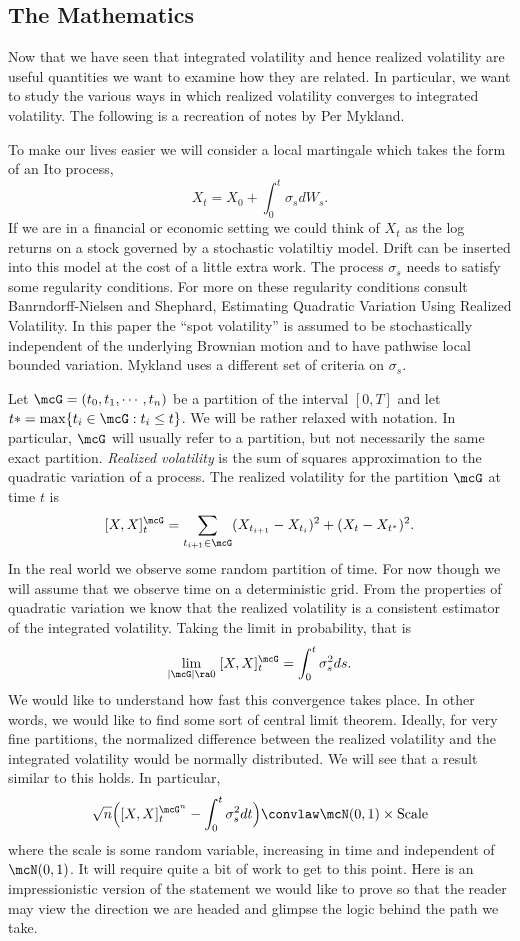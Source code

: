 \documentclass{report}
\begin{document}
\subsection{The Mathematics}

Now that we have seen that integrated volatility and hence realized
volatility are useful quantities we want to examine how they are
related.  In particular, we want to study the various ways in which
realized volatility converges to integrated volatility.  The following
is a recreation of notes by Per Mykland.

To make our lives easier we will consider a local martingale which
takes the form of an Ito process,
\[
X_t = X_0 + \int_0^t \sigma_s dW_s.
\]
If we are in a financial or economic setting we could think of $X_t$
as the log returns on a stock governed by a stochastic volatiltiy
model.  Drift can be inserted into this model at the cost of a little
extra work.  The process $\sigma_s$ needs to satisfy some regularity
conditions.  For more on these regularity conditions consult
Banrndorff-Nielsen and Shephard, Estimating Quadratic Variation Using
Realized Volatility.  In this paper the ``spot volatility'' is assumed
to be stochastically independent of the underlying Brownian motion and
to have pathwise local bounded variation.  Mykland uses a different
set of criteria on $\sigma_s$.

Let $\mcG = (t_0, t_1, \cdots, t_n)$ be a partition of the interval
$[0,T]$ and let $t* = \max \{ t_i \in \mcG : t_i \leq t \}$.  We will
be rather relaxed with notation.  In particular, $\mcG$ will usually
refer to a partition, but not necessarily the same exact partition.  
\emph{Realized volatility} is the sum of squares approximation to the
quadratic variation of a process.  The realized volatility for the
partition $\mcG$ at time $t$ is
\[
[X,X]^{\mcG}_t = \sum_{t_{i+1} \in \mcG} (X_{t_{i+1}} - X_{t_i})^2 +
(X_{t} - X_{t^*})^2.
\]
In the real world we observe some random partition of time.  For now
though we will assume that we observe time on a deterministic grid. 
From the properties of quadratic variation we know that the realized
volatility is a consistent estimator of the integrated volatility. 
Taking the limit in probability, that is
\[
\lim_{|\mcG| \ra 0} \; [X,X]^{\mcG}_t = \int_0^t \sigma_s^2 ds.
\]
We would like to understand how fast this convergence takes place.  In
other words, we would like to find some sort of central limit theorem. 
Ideally, for very fine partitions, the normalized difference between
the realized volatility and the integrated volatility would be
normally distributed.  We will see that a result similar to this
holds.  In particular,
\[
\sqrt{n} \Big([X,X]^{\mcG^n}_t - \int_0^t \sigma_s^2 dt \Big) \convlaw
\mcN(0,1) \times \textmd{Scale}
\]
where the scale is some random variable, increasing in time and
independent of $\mcN(0,1)$.  It will require quite a bit of work to
get to this point.  Here is an impressionistic version of the
statement we would like to prove so that the reader may view the
direction we are headed and glimpse the logic behind the path we take.
\end{document}
